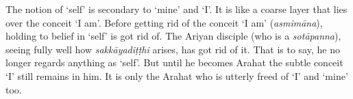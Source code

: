 The notion of `self' is secondary to `mine' and `I'. It is like a coarse layer that lies over the conceit `I am'. Before getting rid of the conceit `I am' (\textit{asmimāna}), holding to belief in `self' is got rid of. The Ariyan disciple (who is a \textit{sotāpanna}), seeing fully well how \textit{sakkāyadiṭṭhi} arises, has got rid of it. That is to say, he no longer regards anything as `self'. But until he becomes Arahat the subtle conceit `I' still remains in him. It is only the Arahat who is utterly freed of `I' and `mine' too.
